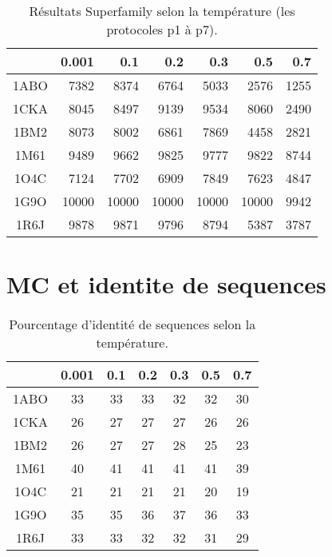 \documentclass[a4paper,12pt]{article}
\begin{document}
    \begin{table}[!htbp]
      \centering

      \begin{tabular}{|c|r|r|r|r|r|r|}

        \hline
         & 0.001 & 0.1 & 0.2  & 0.3 & 0.5 & 0.7  \\
        \hline
        1ABO & 7382  & 8374 & 6764 & 5033 & 2576  & 1255  \\      
        1CKA & 8045  & 8497 & 9139 & 9534 & 8060  & 2490  \\  
        1BM2 & 8073  & 8002 & 6861 & 7869 & 4458  & 2821  \\  
        1M61 & 9489  & 9662 & 9825 & 9777 & 9822  & 8744  \\  
        1O4C & 7124  & 7702 & 6909 & 7849 & 7623  & 4847  \\  
        1G9O & 10000 & 10000 & 10000 & 10000 & 10000  & 9942 \\  
        1R6J & 9878  & 9871 & 9796 & 8794 & 5387 & 3787 \\  \hline
        
      \end{tabular}
      
      \caption{Résultats Superfamily selon la température (les protocoles p1 à p7).}      
      \label{tab_temp}

    \end{table}



    \section{MC et identite de sequences}


    \begin{table}[!htbp]
      \centering
      
      \begin{tabular}{|c|c|c|c|c|c|c|}
      
        \hline
        & 0.001 & 0.1 & 0.2  & 0.3 & 0.5 & 0.7  \\
        \hline
        1ABO & 33 & 33 & 33 & 32 & 32  & 30 \\      
        1CKA & 26 & 27 & 27 & 27 & 26  & 26 \\  
        1BM2 & 26 & 27 & 27 & 28 & 25  & 23 \\  
        1M61 & 40 & 41 & 41 & 41 & 41  & 39 \\  
        1O4C & 21 & 21 & 21 & 21 & 20  & 19 \\  
        1G9O & 35 & 35 & 36 & 37 & 36  & 33 \\  
        1R6J & 33 & 33 & 32 & 32 & 31  & 29 \\  \hline
        
      \end{tabular}
      

      \caption{Pourcentage d'identité de sequences selon la température.}      
      \label{tab_ident}
    \end{table}
\end{document}
